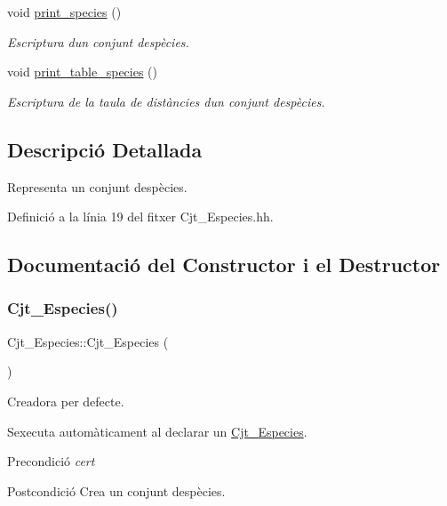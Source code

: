 \begin{DoxyCompactItemize}
void \hyperlink{class_cjt___especies_a362d2295d52e2a4cb3618bda7ad3f65b}{print\+\_\+species} ()
\begin{DoxyCompactList}\small\item\em Escriptura d\textquotesingle{}un conjunt d\textquotesingle{}espècies. \end{DoxyCompactList}\item 
void \hyperlink{class_cjt___especies_ab6ebf81bf6ad734a970c3677fd4e5250}{print\+\_\+table\+\_\+species} ()
\begin{DoxyCompactList}\small\item\em Escriptura de la taula de distàncies d\textquotesingle{}un conjunt d\textquotesingle{}espècies. \end{DoxyCompactList}\end{DoxyCompactItemize}


\subsection{Descripció Detallada}
Representa un conjunt d\textquotesingle{}espècies. 

Definició a la línia 19 del fitxer Cjt\+\_\+\+Especies.\+hh.



\subsection{Documentació del Constructor i el Destructor}
\mbox{\label{class_cjt___especies_ae423b9d5a456158136c17d9210c90c2e}} 
\subsubsection{\texorpdfstring{Cjt\+\_\+\+Especies()}{Cjt\_Especies()}}
{\footnotesize\ttfamily Cjt\+\_\+\+Especies\+::\+Cjt\+\_\+\+Especies (\begin{DoxyParamCaption}{ }\end{DoxyParamCaption})}



Creadora per defecte. 

S\textquotesingle{}executa automàticament al declarar un \hyperlink{class_cjt___especies}{Cjt\+\_\+\+Especies}.

\begin{DoxyPrecond}{Precondició}
{\itshape cert} 
\end{DoxyPrecond}
\begin{DoxyPostcond}{Postcondició}
Crea un conjunt d\textquotesingle{}espècies. 
\end{DoxyPostcond}


